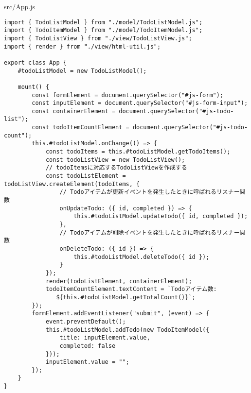 \begin{listtitle}
src/App.js
\end{listtitle}
\begin{lstlisting}
import { TodoListModel } from "./model/TodoListModel.js";
import { TodoItemModel } from "./model/TodoItemModel.js";
import { TodoListView } from "./view/TodoListView.js";
import { render } from "./view/html-util.js";

export class App {
    #todoListModel = new TodoListModel();

    mount() {
        const formElement = document.querySelector("#js-form");
        const inputElement = document.querySelector("#js-form-input");
        const containerElement = document.querySelector("#js-todo-list");
        const todoItemCountElement = document.querySelector("#js-todo-count");
        this.#todoListModel.onChange(() => {
            const todoItems = this.#todoListModel.getTodoItems();
            const todoListView = new TodoListView();
            // todoItemsに対応するTodoListViewを作成する
            const todoListElement = todoListView.createElement(todoItems, {
                // Todoアイテムが更新イベントを発生したときに呼ばれるリスナー関数
                onUpdateTodo: ({ id, completed }) => {
                    this.#todoListModel.updateTodo({ id, completed });
                },
                // Todoアイテムが削除イベントを発生したときに呼ばれるリスナー関数
                onDeleteTodo: ({ id }) => {
                    this.#todoListModel.deleteTodo({ id });
                }
            });
            render(todoListElement, containerElement);
            todoItemCountElement.textContent = `Todoアイテム数:
               ${this.#todoListModel.getTotalCount()}`;
        });
        formElement.addEventListener("submit", (event) => {
            event.preventDefault();
            this.#todoListModel.addTodo(new TodoItemModel({
                title: inputElement.value,
                completed: false
            }));
            inputElement.value = "";
        });
    }
}
\end{lstlisting}
\listend
